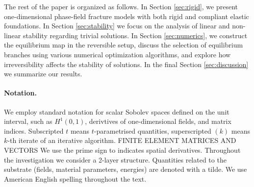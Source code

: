 

{The rest of the paper is organized as follows. In Section \ref{sec:rigid}, we present one-dimensional phase-field fracture models with both rigid and compliant elastic foundations. In Section \ref{sec:stability} we focus on the analysis  of linear and non-linear stability regarding trivial solutions. In Section \ref{sec:numerics}, we construct the equilibrium map in the reversible setup, discuss the selection of equilibrium branches using various numerical optimization algorithms, and explore how irreversibility affects the stability of solutions. In the final Section \ref{sec:discussion}  we summarize our results.}



\paragraph{Notation.} We employ standard notation for scalar Sobolev spaces defined on the unit interval, such as $H^1(0, 1)$, derivtives of one-dimensional fields, and matrix indices. Subscripted $t$ means $t$-parametrised quantities, superscripted $(k)$ means $k$-th iterate of an iterative algorithm. 
FINITE ELEMENT MATRICES AND VECTORS 
We use the prime sign to indicates spatial derivatives. Throughout the investigation we consider a 2-layer structure. Quantities related to the substrate (fields, material parameters, energies) are denoted with a tilde.
We use American English spelling throughout the text.
